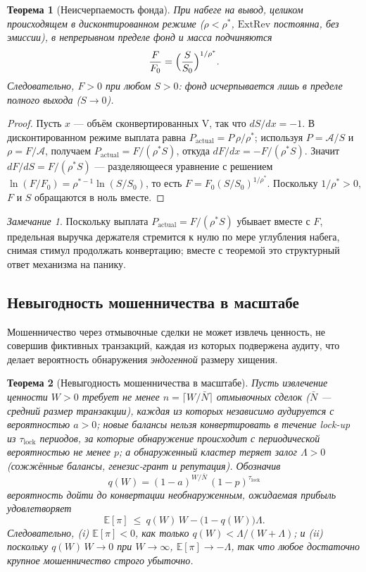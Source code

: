 \documentclass[11pt]{article}
\theoremstyle{plain}
\newtheorem{theorem}{Теорема}
\theoremstyle{definition}
\theoremstyle{remark}
\newtheorem{remark}{Замечание}
\newcommand{\V}{\mathrm{V}}
\newcommand{\ExtRev}{\mathrm{ExtRev}}
\begin{document}
\begin{theorem}[Неисчерпаемость фонда]\label{thm:norun}
При набеге на вывод, целиком происходящем в дисконтированном режиме ($\rho<\rho^*$, $\ExtRev$ постоянна, без эмиссии), в непрерывном пределе фонд и масса подчиняются
\[
\frac{F}{F_0}=\Bigl(\frac{S}{S_0}\Bigr)^{1/\rho^*}.
\]
Следовательно, $F>0$ при любом $S>0$: фонд исчерпывается лишь в пределе полного выхода ($S\to0$).
\end{theorem}

\begin{proof}
Пусть $x$ --- объём сконвертированных $\V$, так что $dS/dx=-1$. В дисконтированном режиме выплата равна $P_{\mathrm{actual}}=P\,\rho/\rho^*$; используя $P=\mathcal{A}/S$ и $\rho=F/\mathcal{A}$, получаем $P_{\mathrm{actual}}=F/(\rho^*S)$, откуда $dF/dx=-F/(\rho^*S)$. Значит $dF/dS=F/(\rho^*S)$ --- разделяющееся уравнение с решением $\ln(F/F_0)=\rho^{*-1}\ln(S/S_0)$, то есть $F=F_0(S/S_0)^{1/\rho^*}$. Поскольку $1/\rho^*>0$, $F$ и $S$ обращаются в ноль вместе.
\end{proof}

\begin{remark}
Поскольку выплата $P_{\mathrm{actual}}=F/(\rho^*S)$ убывает вместе с $F$, предельная выручка держателя стремится к нулю по мере углубления набега, снимая стимул продолжать конвертацию; вместе с теоремой это структурный ответ механизма на панику.
\end{remark}

\subsection{Невыгодность мошенничества в масштабе}

Мошенничество через отмывочные сделки не может извлечь ценность, не совершив фиктивных транзакций, каждая из которых подвержена аудиту, что делает вероятность обнаружения \emph{эндогенной} размеру хищения.

\begin{theorem}[Невыгодность мошенничества в масштабе]\label{thm:fraud}
Пусть извлечение ценности $W>0$ требует не менее $n=\lceil W/\bar N\rceil$ отмывочных сделок ($\bar N$ --- средний размер транзакции), каждая из которых независимо аудируется с вероятностью $a>0$; новые балансы нельзя конвертировать в течение lock-up из $\tau_{\mathrm{lock}}$ периодов, за которые обнаружение происходит с периодической вероятностью не менее $p$; а обнаруженный кластер теряет залог $\Lambda>0$ (сожжённые балансы, генезис-грант и репутация). Обозначив
\[
q(W)=(1-a)^{W/\bar N}\,(1-p)^{\tau_{\mathrm{lock}}}
\]
вероятность дойти до конвертации необнаруженным, ожидаемая прибыль удовлетворяет
\[
\mathbb{E}[\pi]\ \le\ q(W)\,W-\bigl(1-q(W)\bigr)\Lambda .
\]
Следовательно, \textup{(i)} $\mathbb{E}[\pi]<0$, как только $q(W)<\Lambda/(W+\Lambda)$; и \textup{(ii)} поскольку $q(W)\,W\to0$ при $W\to\infty$, $\mathbb{E}[\pi]\to-\Lambda$, так что любое достаточно крупное мошенничество строго убыточно.
\end{theorem}
\end{document}
